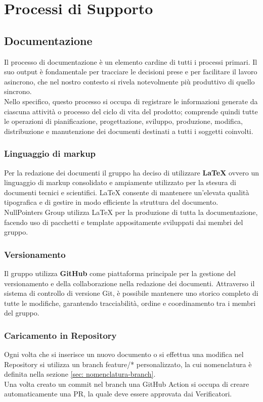 \section{Processi di Supporto}
\subsection{Documentazione}
    Il processo di documentazione è un elemento cardine di tutti i processi primari. Il suo output è fondamentale per tracciare le decisioni prese e per facilitare il lavoro asincrono, che nel nostro contesto si rivela notevolmente più produttivo di quello sincrono. \\
    Nello specifico, questo processo si occupa di registrare le informazioni generate da ciascuna attività o processo del ciclo di vita del prodotto; comprende quindi tutte le operazioni di pianificazione, progettazione, sviluppo, produzione, modifica, distribuzione e manutenzione dei documenti destinati a tutti i soggetti coinvolti.

\subsubsection{Linguaggio di markup}
    Per la redazione dei documenti il gruppo ha deciso di utilizzare \textbf{LaTeX} ovvero un linguaggio di markup consolidato e ampiamente utilizzato per la stesura di documenti tecnici e scientifici. LaTeX consente di mantenere un’elevata qualità tipografica e di gestire in modo efficiente la struttura del documento.\\
    NullPointers Group utilizza LaTeX per la produzione di tutta la documentazione, facendo uso di pacchetti e template appositamente sviluppati dai membri del gruppo.

\subsubsection{Versionamento}
    Il gruppo utilizza \textbf{GitHub} come piattaforma principale per la gestione del versionamento e della collaborazione nella redazione dei documenti.
    Attraverso il sistema di controllo di versione Git, è possibile mantenere uno storico completo di tutte le modifiche, garantendo tracciabilità, ordine e coordinamento tra i membri del gruppo.

\subsubsection{Caricamento in Repository}
    Ogni volta che si inserisce un nuovo documento o si effettua una modifica nel Repository si utilizza un branch feature/* personalizzato, la cui nomenclatura è definita nella sezione \ref{sec: nomenclatura-branch}.\\
    Una volta creato un commit nel branch una GitHub Action si occupa di creare automaticamente una PR, la quale deve essere approvata dai Verificatori.

